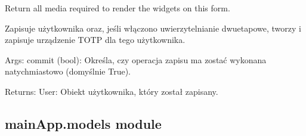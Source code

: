 \documentclass[letterpaper,11pt,polish]{sphinxmanual}
\begin{document}
\begin{fulllineitems}

\begin{fulllineitems}
\label{\detokenize{mainApp:mainApp.forms.UserForm.media}}
\pysigstartsignatures
{}
\pysigstopsignatures
\sphinxAtStartPar
Return all media required to render the widgets on this form.

\end{fulllineitems}


\begin{fulllineitems}
\label{\detokenize{mainApp:mainApp.forms.UserForm.save}}
\pysigstartsignatures
{}
\pysigstopsignatures
\sphinxAtStartPar
Zapisuje użytkownika oraz, jeśli włączono uwierzytelnianie dwuetapowe,
tworzy i zapisuje urządzenie TOTP dla tego użytkownika.

\sphinxAtStartPar
Args:
commit (bool): Określa, czy operacja zapisu ma zostać wykonana natychmiastowo (domyślnie True).

\sphinxAtStartPar
Returns:
User: Obiekt użytkownika, który został zapisany.

\end{fulllineitems}


\end{fulllineitems}



\subsection{mainApp.models module}
\label{\detokenize{mainApp:module-mainApp.models}}\label{\detokenize{mainApp:mainapp-models-module}}
\end{document}
